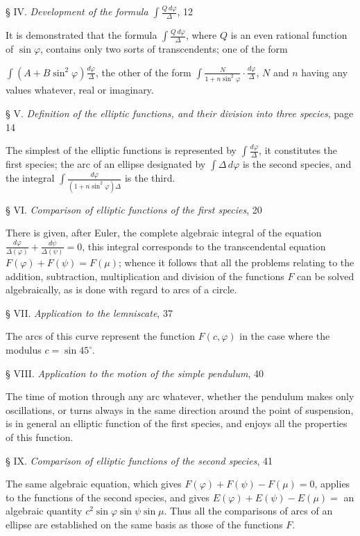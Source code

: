 \documentclass{article}
\begin{document}
§ IV. \emph{Development of the formula $\displaystyle\int\frac{Q\,d\varphi}{\Delta}$}, 12

It is demonstrated that the formula $\displaystyle\int\frac{Q\,d\varphi}{\Delta}$, where $Q$ is an even rational function of $\sin\varphi$, contains only two sorts of transcendents; one of the form

$\displaystyle\int(A+B\sin^{2}\varphi)\frac{d\varphi}{\Delta}$, the other of the form $\displaystyle\int\frac{N}{1+n\sin^{2}\varphi}\cdot\frac{d\varphi}{\Delta}$, $N$ and $n$ having any values whatever, real or imaginary.

§ V. \emph{Definition of the elliptic functions, and their division into three species}, page 14

The simplest of the elliptic functions is represented by $\displaystyle\int\frac{d\varphi}{\Delta}$, it constitutes the first species; the arc of an ellipse designated by $\displaystyle\int\Delta\,d\varphi$ is the second species, and the integral $\displaystyle\int\frac{d\varphi}{(1+n\sin^{2}\varphi)\Delta}$ is the third.

§ VI. \emph{Comparison of elliptic functions of the first species}, 20

There is given, after Euler, the complete algebraic integral of the equation $\frac{d\varphi}{\Delta(\varphi)}+\frac{d\psi}{\Delta(\psi)}=0$, this integral corresponds to the transcendental equation $F(\varphi)+F(\psi)=F(\mu)$; whence it follows that all the problems relating to the addition, subtraction, multiplication and division of the functions $F$ can be solved algebraically, as is done with regard to arcs of a circle.

§ VII. \emph{Application to the lemniscate}, 37

The arcs of this curve represent the function $F(c,\varphi)$ in the case where the modulus $c=\sin45^{\circ}$.

§ VIII. \emph{Application to the motion of the simple pendulum}, 40

The time of motion through any arc whatever, whether the pendulum makes only oscillations, or turns always in the same direction around the point of suspension, is in general an elliptic function of the first species, and enjoys all the properties of this function.

§ IX. \emph{Comparison of elliptic functions of the second species}, 41

The same algebraic equation, which gives $F(\varphi)+F(\psi)-F(\mu)=0$, applies to the functions of the second species, and gives $E(\varphi)+E(\psi)-E(\mu)=$ an algebraic quantity $c^{2}\sin\varphi\sin\psi\sin\mu$. Thus all the comparisons of arcs of an ellipse are established on the same basis as those of the functions $F$.
\end{document}
